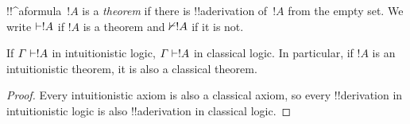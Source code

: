 \documentclass[../../../include/open-logic-section]{subfiles}
\begin{document}
\begin{defn}[Theorems]
!!^a{formula}~$!A$ is a \emph{theorem} if there is !!a{derivation}
of~$!A$ from the empty set.  We write $\Proves !A$ if $!A$ is a
theorem and $\Proves/ !A$ if it is not.
\end{defn}

\begin{prop}
  If $\Gamma \Proves !A$ in intuitionistic logic, $\Gamma \Proves !A$ in
  classical logic. In particular, if $!A$ is an intuitionistic
  theorem, it is also a classical theorem.
\end{prop}

\begin{proof}
  Every intuitionistic axiom is also a classical axiom, so every
  !!{derivation} in intuitionistic logic is also !!a{derivation} in
  classical logic.
\end{proof}
\end{document}
